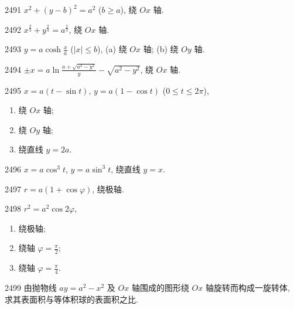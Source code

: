 \begin{prob}[S]{2491}
$x^2 + (y - b)^2 = a^2$ ($b \geqslant a$), 绕 $Ox$ 轴.
\end{prob}

\begin{prob}[S]{2492}
$x^{\frac{2}{3}} + y^{\frac{2}{3}} = a^{\frac{2}{3}}$, 绕 $Ox$ 轴.
\end{prob}

\begin{prob}[M]{2493}
$y = a\cosh\frac{x}{a}$ ($|x| \leqslant b$), (a) 绕 $Ox$ 轴; \qquad (b) 绕 $Oy$ 轴.
\end{prob}

\begin{prob}[S]{2494}
$\pm x = a\ln\frac{a + \sqrt{a^2 - y^2}}{y} - \sqrt{a^2 - y^2}$, 绕 $Ox$ 轴.
\end{prob}

\begin{prob}[L]{2495}
$x = a(t - \sin t)$, $y = a(1 - \cos t)$ ($0 \leqslant t \leqslant 2\pi$),
\begin{enumerate}[label=(\alph*), itemsep=2pt, topsep=3pt]
\item 绕 $Ox$ 轴;
\item 绕 $Oy$ 轴;
\item 绕直线 $y = 2a$.
\end{enumerate}
\end{prob}

\begin{prob}[S]{2496}
$x = a\cos^3 t$, $y = a\sin^3 t$, 绕直线 $y = x$.
\end{prob}

\begin{prob}[S]{2497}
$r = a(1 + \cos\varphi)$, 绕极轴.
\end{prob}

\begin{prob}[L]{2498}
$r^2 = a^2\cos 2\varphi$,
\begin{enumerate}[label=(\alph*), itemsep=2pt, topsep=3pt]
\item 绕极轴;
\item 绕轴 $\varphi = \frac{\pi}{2}$;
\item 绕轴 $\varphi = \frac{\pi}{4}$.
\end{enumerate}
\end{prob}

\begin{prob}[M]{2499}
由抛物线 $ay = a^2 - x^2$ 及 $Ox$ 轴围成的图形绕 $Ox$ 轴旋转而构成一旋转体, 求其表面积与等体积球的表面积之比.
\end{prob}

